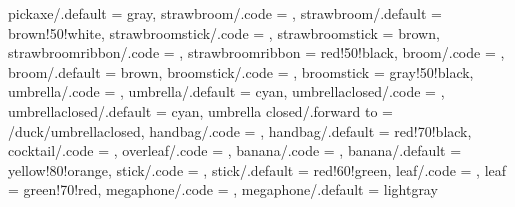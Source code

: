 {  pickaxe/.default          = gray, 
  strawbroom/.code          = \duck@strawbroomtrue
                              \def\duck@strawbroom{#1},
  strawbroom/.default       = brown!50!white,
  strawbroomstick/.code     = \def\duck@strawbroomstick{#1},
  strawbroomstick           = brown,
  strawbroomribbon/.code    = \def\duck@strawbroomribbon{#1},
  strawbroomribbon          = red!50!black,
  broom/.code               = \duck@broomtrue
                              \def\duck@broom{#1},
  broom/.default            = brown,
  broomstick/.code          = \def\duck@broomstick{#1},
  broomstick                = gray!50!black,  
  umbrella/.code            = \duck@umbrellatrue
                              \def\duck@umbrella{#1},
  umbrella/.default         = cyan,      
  umbrellaclosed/.code      = \duck@umbrellaclosedtrue
                              \def\duck@umbrellaclosed{#1},
  umbrellaclosed/.default   = cyan,    
  umbrella closed/.forward to  = /duck/umbrellaclosed,
  handbag/.code             = \duck@handbagtrue
                              \def\duck@handbag{#1},
  handbag/.default          = red!70!black,  
  cocktail/.code            = \duck@cocktailtrue,
  overleaf/.code            = \duck@overleaftrue 
                              \def\duck@body{duck@overleafcol}
                              \duck@graduatetrue
                              \def\duck@graduate{black}
                              \duck@squareglassestrue
                              \def\duck@squareglasses{black},
  banana/.code              = \duck@bananatrue
                              \def\duck@banana{#1},
  banana/.default           = yellow!80!orange,
  stick/.code               = \duck@sticktrue
                              \def\duck@stick{#1},
  stick/.default            = red!60!green,
  leaf/.code                = \def\duck@leaf{#1},
  leaf                      = green!70!red,
  megaphone/.code           = \duck@megaphonetrue
                              \def\duck@megaphone{#1},
  megaphone/.default        = lightgray
}

